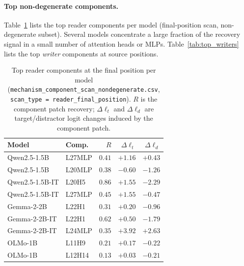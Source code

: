\documentclass[11pt]{article}
\begin{document}
\paragraph{Top non-degenerate components.}
Table~\ref{tab:top_components} lists the top reader components per model (final-position scan,
non-degenerate subset). Several models concentrate a large fraction of the recovery signal in a
small number of attention heads or MLPs. Table~\ref{tab:top_writers} lists the top
\emph{writer} components at source positions.

\begin{table}[H]
\centering
\footnotesize
\begin{tabular*}{\columnwidth}{@{\extracolsep{\fill}}llrrr@{}}
\toprule
Model & Comp. & $R$ & $\Delta\ell_t$ & $\Delta\ell_d$ \\
\midrule
Qwen2.5-1.5B    & L27MLP & $0.41$ & $+1.16$ & $+0.43$ \\
Qwen2.5-1.5B    & L20MLP & $0.38$ & $-0.60$ & $-1.26$ \\
Qwen2.5-1.5B-IT & L20H5  & $0.86$ & $+1.55$ & $-2.29$ \\
Qwen2.5-1.5B-IT & L27MLP & $0.45$ & $+1.55$ & $-0.47$ \\
Gemma-2-2B      & L22H1  & $0.31$ & $+0.20$ & $-0.96$ \\
Gemma-2-2B-IT   & L22H1  & $0.62$ & $+0.50$ & $-1.79$ \\
Gemma-2-2B-IT   & L24MLP & $0.35$ & $+3.92$ & $+2.63$ \\
OLMo-1B         & L11H9  & $0.21$ & $+0.17$ & $-0.22$ \\
OLMo-1B         & L12H14 & $0.13$ & $+0.03$ & $-0.21$ \\
\bottomrule
\end{tabular*}
\caption{Top reader components at the final position per model
(\texttt{mechanism\_component\_scan\_\allowbreak nondegenerate.csv}, \texttt{scan\_type =
reader\_final\_position}). $R$ is the component patch recovery; $\Delta\ell_t$ and $\Delta\ell_d$
are target/distractor logit changes induced by the component patch.}
\label{tab:top_components}
\end{table}
\end{document}
